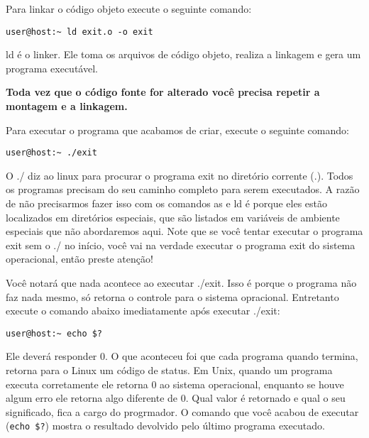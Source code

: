 Para linkar o código objeto execute o seguinte comando:

\begin{espacosimples}
\begin{verbatim}
user@host:~ ld exit.o -o exit
\end{verbatim}
\end{espacosimples}

ld é o linker. Ele toma os arquivos de código objeto, realiza a linkagem e gera um programa executável.

\textbf{Toda vez que o código fonte for alterado você precisa repetir a montagem e a linkagem.}

Para executar o programa que acabamos de criar, execute o seguinte comando:

\begin{espacosimples}
\begin{verbatim}
user@host:~ ./exit
\end{verbatim}
\end{espacosimples}

O ./ diz ao linux para procurar o programa exit no diretório corrente (.). Todos os programas precisam do seu caminho completo para serem executados. A razão de não precisarmos fazer isso com os comandos as e ld é porque eles estão localizados em diretórios especiais, que são listados em variáveis de ambiente especiais que não abordaremos aqui. Note que se você tentar executar o programa exit sem o ./ no início, você vai na verdade executar o programa exit do sistema operacional, então preste atenção!

Você notará que nada acontece ao executar ./exit. Isso é porque o programa não faz nada mesmo, só retorna o controle para o sistema opracional. Entretanto execute o comando abaixo imediatamente após executar ./exit:

\begin{espacosimples}
\begin{verbatim}
user@host:~ echo $?
\end{verbatim}
\end{espacosimples}

Ele deverá responder 0. O que aconteceu foi que cada programa quando termina, retorna para o Linux um código de status. Em Unix, quando um programa executa corretamente ele retorna 0 ao sistema operacional, enquanto se houve algum erro ele retorna algo diferente de 0. Qual valor é retornado e qual o seu significado, fica a cargo do progrmador. O comando que você acabou de executar (\texttt{echo \$?}) mostra o resultado devolvido pelo último programa executado.

